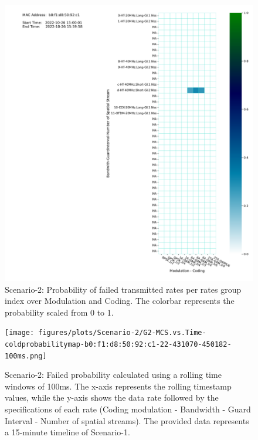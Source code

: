 \begin{figure}[hbt!]
  \centering
  \includegraphics[width=\textwidth]{figures/plots/Scenario-2/G2-coldmap-p-b0:f1:d8:50:92:c1-22-431070-450182.png}
  \caption[Rate-Based Transmission Failure Analysis]{Scenario-2: Probability of failed transmitted rates per rates group index over Modulation and Coding. The colorbar represents the probability scaled from 0 to 1.}
  \label{fig:Fail-probability2}
\end{figure}
\FloatBarrier 

\begin{landscape}
\begin{figure}[hbt!]
  \centering
  \texttt{[image: figures/plots/Scenario-2/G2-MCS.vs.Time-coldprobabilitymap-b0:f1:d8:50:92:c1-22-431070-450182-100ms.png]}  
  \caption[Rate-Based Transmission Failure Analysis with Rolling Time Averages]{Scenario-2: Failed probability calculated using a rolling time windows of 100ms. The x-axis represents the rolling timestamp values, while the y-axis shows the data rate followed by the specifications of each rate (Coding modulation - Bandwidth - Guard Interval - Number of spatial streams). The provided data represents a 15-minute timeline of Scenario-1.}
  \label{fig:Rolling-Fail2}
\end{figure}
\FloatBarrier 
\end{landscape}


